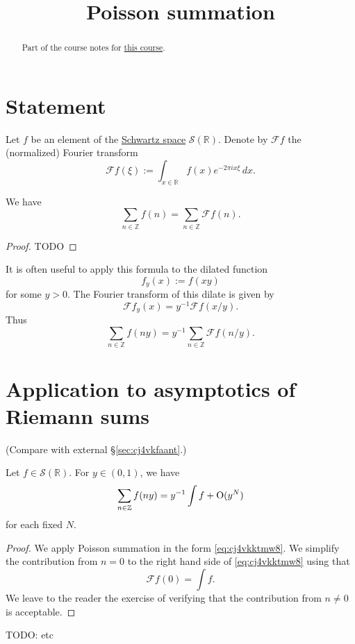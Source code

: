 \documentclass[reqno]{amsart} 
\begin{document}
\title{Poisson summation}
\begin{abstract}
  Part of the course notes for \href{2023-introduction-to-zeta-and-l-functions.pdf}{this course}.
\end{abstract}

\section{Statement}
Let $f$ be an element of the \href{https://en.wikipedia.org/wiki/Schwartz_space}{Schwartz space} $\mathcal{S}(\mathbb{R})$.  Denote by $\mathcal{F} f$ the (normalized) Fourier transform
\begin{equation*}
  \mathcal{F} f (\xi) := \int_{x \in \mathbb{R} } f(x) e^{- 2 \pi i x \xi } \, d x.
\end{equation*}
\begin{theorem}
  We have
  \begin{equation*}
    \sum_{n \in \mathbb{Z} } f (n) = \sum_{n \in \mathbb{Z} } \mathcal{F} f (n). 
  \end{equation*}
\end{theorem}
\begin{proof}
  TODO
\end{proof}

It is often useful to apply this formula to the dilated function
\begin{equation*}
  f_y(x) := f(x y)
\end{equation*}
for some $y > 0$.  The Fourier transform of this dilate is given by
\begin{equation*}
  \mathcal{F} f_y(x) = y^{-1} \mathcal{F} f(x /y).
\end{equation*}
Thus
\begin{equation}\label{eq:cj4vkktmw8}
  \sum_{n \in \mathbb{Z} } f (n y) = y^{-1} \sum_{n \in \mathbb{Z} } \mathcal{F} f (n / y).
\end{equation}


\section{Application to asymptotics of Riemann sums}\label{sec:cj4vkkp26q}
(Compare with external \S\ref{sec:cj4vkfaant}.)

\begin{lemma}
  Let $f \in \mathcal{S}(\mathbb{R})$.  For $y \in (0,1)$, we have
  \begin{equation*}
    \sum_{n \in \mathbb{Z} } f(n y) = y^{-1}  \int f + \operatorname{O}(y^N)
  \end{equation*}
  for each fixed $N$.
\end{lemma}
\begin{proof}
  We apply Poisson summation in the form \eqref{eq:cj4vkktmw8}.  We simplify the contribution from $n=0$ to the right hand side of \eqref{eq:cj4vkktmw8} using that
  \begin{equation*}
\mathcal{F} f(0) = \int f.
  \end{equation*}
  We leave to the reader the exercise of verifying that the contribution from $n \neq 0$ is acceptable.
\end{proof}

TODO: etc



{} 
\end{document}
